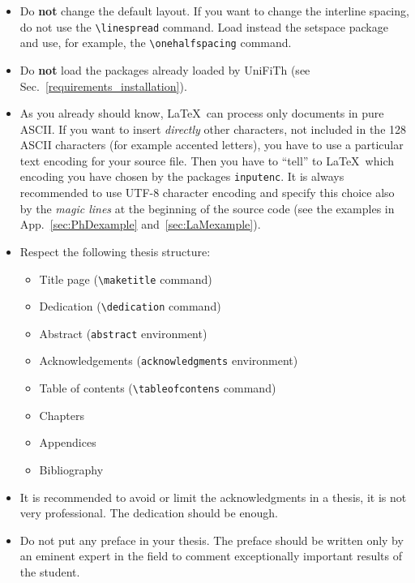 \documentclass[a5paper,11pt]{article}
\newcommand{\bs}{\textbackslash}
\begin{document}
\begin{itemize}

\item Do \textbf{not} change the default layout. If you want to change the interline spacing, do not use the \texttt{\bs linespread} command. Load instead the \textsf{setspace} package and use, for example, the \texttt{\bs onehalfspacing} command.

\item Do \textbf{not} load the packages already loaded by \textsf{UniFiTh} (see Sec.~\ref{requirements_installation}).

\item As you already should know, \LaTeX\ can process only documents
in pure ASCII. If you want to insert \emph{directly} other characters, not included in the 128 ASCII characters (for example accented letters), you have to use a particular text encoding for your source file. Then you have to ``tell'' to \LaTeX\ which encoding you have chosen by the packages \texttt{inputenc}. It is always recommended to use UTF-8 character encoding and specify this choice also by the \emph{magic lines} at the beginning of the source code (see the examples in App.~\ref{sec:PhDexample} and~\ref{sec:LaMexample}).

\item Respect the following thesis structure:

\begin{itemize}
\item Title page (\texttt{\bs maketitle} command)
\item Dedication (\texttt{\bs dedication} command)
\item Abstract (\texttt{abstract} environment)
\item Acknowledgements (\texttt{acknowledgments} environment)
\item Table of contents (\texttt{\bs tableofcontens} command)
\item Chapters
\item Appendices
\item Bibliography
\end{itemize}

\item It is recommended to avoid or limit the acknowledgments in a thesis, it 
is not very professional. The dedication should be enough.

\item Do not put any preface in your thesis. The preface should be written only by an eminent expert in the field to comment exceptionally important results of the student.


\end{itemize}
\end{document}
